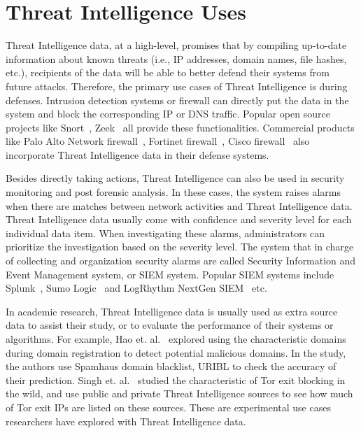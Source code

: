 \section{Threat Intelligence Uses}

Threat Intelligence data, at a high-level, promises that by compiling up-to-date 
information about known threats (i.e., IP addresses, domain names, file hashes, 
etc.), recipients of the data will be able to better defend their systems from 
future attacks. Therefore, the primary use cases of Threat Intelligence is 
during defenses. Intrusion detection systems or firewall can directly put 
the data in the system and block the corresponding IP or DNS traffic. Popular 
open source projects like Snort~\cite{snortids}, Zeek~\cite{zeekids} all provide 
these functionalities. Commercial products like Palo Alto Network
firewall~\cite{paloaltofirewall}, Fortinet firewall~\cite{fortinetfirewall}, 
Cisco firewall~\cite{ciscofirewall} also incorporate Threat Intelligence data in 
their defense systems. 

Besides directly taking actions, Threat Intelligence can also be used in security
monitoring and post forensic analysis. In these cases, the system raises alarms
when there are matches between network activities and Threat Intelligence data.
Threat Intelligence data usually come with confidence and severity level for each
individual data item. When investigating these alarms, administrators can 
prioritize the investigation based on the severity level. The system that in 
charge of collecting and organization security alarms are called Security 
Information and Event Management system, or SIEM system. Popular SIEM systems
include Splunk~\cite{splunk}, Sumo Logic~\cite{sumologic} and LogRhythm NextGen 
SIEM~\cite{logrhythm} etc.

In academic research, Threat Intelligence data is usually used as extra source 
data to assist their study, or to evaluate the performance of their systems or
algorithms. For example, Hao et. al.~\cite{hao2016predator} explored using the
characteristic domains during domain registration to detect potential malicious
domains. In the study, the authors use Spamhaus domain blacklist, URIBL to check 
the accuracy of their prediction. Singh et. al.~\cite{singh2017characterizing} 
studied the characteristic of Tor exit blocking in the wild, and use public and
private Threat Intelligence sources to see how much of Tor exit IPs are listed
on these sources. These are experimental use cases researchers have explored 
with Threat Intelligence data. 

